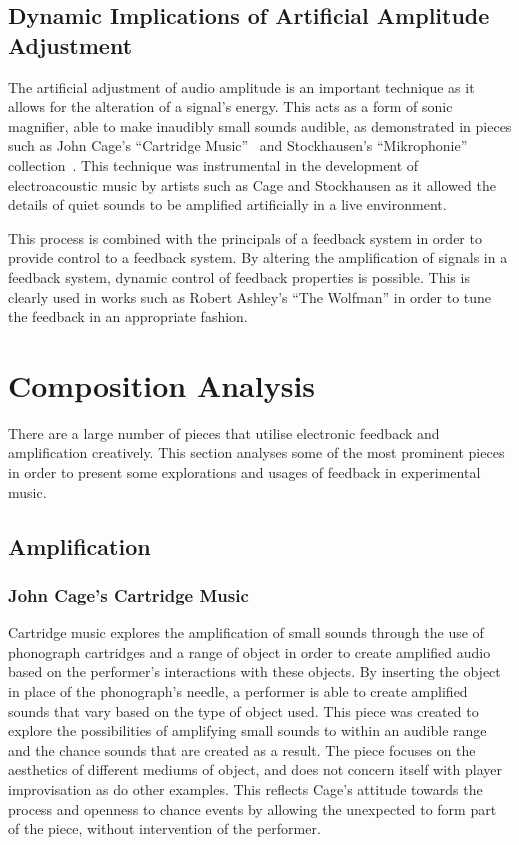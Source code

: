 \documentclass[titlepage]{scrartcl}
\begin{document}
    \subsection{Dynamic Implications of Artificial Amplitude Adjustment}
    The artificial adjustment of audio amplitude is an important technique as it
    allows for the alteration of a signal's energy. This acts as a form of
    sonic magnifier, able to make inaudibly small sounds audible, as
    demonstrated in pieces such as John Cage's ``Cartridge
    Music''~\citeyearpar{cage2013cm} and Stockhausen's ``Mikrophonie''
    collection~\citeyearpar{stockhausen1995mmt}. This technique was instrumental in the
    development of electroacoustic music by artists such as Cage and
    Stockhausen as it allowed the details of quiet sounds to be amplified
    artificially in a live environment.~\parencite[p.351-352]{holmes2012eaem}

    This process is combined with the principals of a feedback system in order
    to provide control to a feedback system. By altering the amplification of
    signals in a feedback system, dynamic control of feedback properties is
    possible. This is clearly used in works such as Robert Ashley's ``The
    Wolfman'' in order to tune the feedback in an appropriate
    fashion.~\parencite[p.186]{holmes2012eaem}

    \section{Composition Analysis}
    There are a large number of pieces that utilise electronic feedback and
    amplification creatively. This section analyses some of the most prominent
    pieces in order to present some explorations and usages of feedback in
    experimental music.

    \subsection{Amplification}\label{amp}
    \subsubsection{John Cage's Cartridge Music~\citeyearpar{cage2013cm}} 
    Cartridge music explores the amplification of small sounds through the use
    of phonograph cartridges and a range of object in order to create amplified
    audio based on the performer's interactions with these objects. By
    inserting the object in place of the phonograph's needle, a performer is
    able to create amplified sounds that vary based on the type of object used.
    This piece was created to explore the possibilities of amplifying small
    sounds to within an audible range and the chance sounds that are created as
    a result.  The piece focuses on the aesthetics of different mediums of
    object, and does not concern itself with player improvisation as do other
    examples. This reflects Cage's attitude towards the process and openness to
    chance events by allowing the unexpected to form part of the piece, without
    intervention of the performer.~\parencite[p.56-61]{lucier2012m109}
\end{document}
